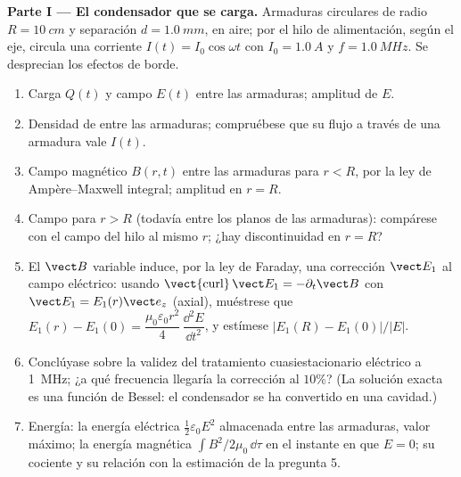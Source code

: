 \begin{problem}
\label{pb:b2:maxwell-equations:1}

\medskip
\noindent\textbf{Parte I --- El condensador que se carga.}
Armaduras circulares de radio $R = \qty{10}{cm}$ y separación $d = \qty{1.0}{mm}$,
en aire; por el hilo de alimentación, según el eje, circula una corriente $I(t) = I_0\cos\omega t$ con $I_0 = \qty{1.0}{A}$ y $f = \qty{1.0}{MHz}$.
Se desprecian los efectos de borde.
\begin{enumerate}
  \item Carga $Q(t)$ y campo $E(t)$ entre las armaduras; amplitud de $E$.
  \item Densidad de  entre las armaduras;
        compruébese que su flujo a través de una armadura vale $I(t)$.
  \item Campo magnético $B(r, t)$ entre las armaduras para $r < R$, por la
        ley de Ampère--Maxwell integral; amplitud en $r = R$.
  \item Campo para $r > R$ (todavía entre los planos de las armaduras):
        compárese con el campo del hilo al mismo $r$; ¿hay discontinuidad
        en $r = R$?
  \item El $\vect B$ variable induce, por la ley de Faraday, una corrección
        $\vect E_1$ al campo eléctrico: usando $\operatorname{\vect{curl}}\vect E_1
        = -\partial_t\vect B$ con $\vect E_1 = E_1(r)\vect e_z$ (axial), muéstrese que
        $E_1(r) - E_1(0) = \dfrac{\mu_0\varepsilon_0r^2}4\,\dfrac{\dd^2E}{\dd t^2}$, y
        estímese $|E_1(R) - E_1(0)|/|E|$.
  \item Conclúyase sobre la validez del tratamiento cuasiestacionario
        eléctrico a \qty{1}{MHz}; ¿a qué frecuencia llegaría la corrección
        al $10\%$? (La solución exacta es una función de Bessel: el
        condensador se ha convertido en una cavidad.)
  \item Energía: la energía eléctrica $\tfrac12\varepsilon_0E^2$ almacenada entre
        las armaduras, valor máximo; la energía magnética $\int B^2/2\mu_0\,\dd\tau$
        en el instante en que $E = 0$; su cociente y su relación con la
        estimación de la pregunta 5.
\end{enumerate}


\end{problem}
